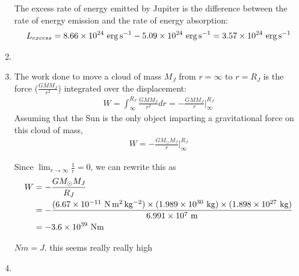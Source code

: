 \documentclass[11pt,letterpaper]{article}
\begin{document}
\begin{enumerate}[label=(\alph*)]
        The excess rate of energy emitted by Jupiter is the difference between the rate of energy emission and the rate of energy absorption: 
        \begin{align*}
            L_{excess} = 8.66\times 10^{24}~{\rm erg\,s^{-1}} - 5.09\times 10^{24}~{\rm erg\,s^{-1}} = 3.57\times 10^{24}~{\rm erg\,s^{-1}}
        \end{align*}

    \item

    \item The work done to move a cloud of mass $M_J$ from $r=\infty$ to $r=R_J$ is the force ($\frac{GMM_J}{r^2}$) integrated over the displacement:
        \begin{align*}
            W = \int_{\infty}^{R_J} \frac{GMM_J}{r^2}dr = -\frac{GMM_J}{r} \Big |_{\infty}^{R_J}
        \end{align*}
        Assuming that the Sun is the only object imparting a gravitational force on this cloud of mass, 
        \begin{align*}
            W = -\frac{GM_\odot M_J}{r} \Big |_{\infty}^{R_J}
        \end{align*}

        Since $\displaystyle\lim_{r\to\infty}\frac{1}{r} = 0$, we can rewrite this as
        \begin{align*}
            W &= -\frac{GM_\odot M_J}{R_J} \\
              &= -\frac{(6.67\times 10^{-11}~{\rm N\,m^2\,kg^{-2}})\times (1.989\times 10^{30}~{\rm kg})\times (1.898\times 10^{27}~{\rm kg})}{6.991 \times 10^{7}~{\rm m}} \\
              &= -3.6\times 10^{39}~{\rm Nm}
        \end{align*}

        {\huge $Nm = J$. this seems really really high}

    \item 



\end{enumerate}
\end{document}
